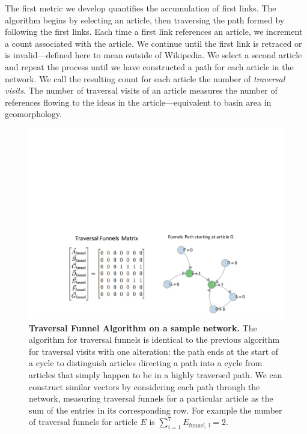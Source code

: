 \documentclass[pre,twocolumn,twoside,superscriptaddress,floatfix, aps, 10pt]{revtex4-1}
\begin{document}
The first metric we develop quantifies the accumulation of first links.
The algorithm begins by selecting an article, then traversing the path formed
by following the first links. Each time a first link references an article, we increment a count
associated with the article. 
We continue until the first link is retraced or is invalid---defined here to mean outside of Wikipedia.
We select a second article and repeat the process until we have 
constructed a path for each article in the network. We call the resulting count for each article the number of {\it traversal visits}. The number of traversal visits of an article 
measures the number of references flowing to the ideas in the article---equivalent
to basin area in geomorphology. 

\begin{figure}[tp!]
  \includegraphics[width=\columnwidth]{graphics/traversal_funnel_algo_figure.pdf}
  \caption{
    \textbf{Traversal Funnel Algorithm on a sample network.}
  The algorithm for traversal funnels is identical to the previous algorithm for traversal visits with one alteration: the path ends at the start of a cycle to distinguish articles directing a path into a cycle from articles that simply happen to be in a highly traversed path. We can construct similar vectors by considering each path through the network, measuring traversal funnels for a particular article as the sum of the entries in its corresponding row. For example
  the number of traversal funnels for article $E$ is 
  $\sum_{i=1}^7 E_{\text{funnel, i}} = 2$.}
  \label{fig:Traversal Funnels}

\end{figure}
\end{document}
